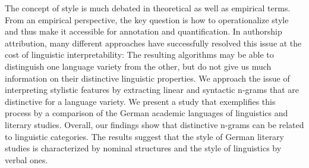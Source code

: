 The concept of style is much debated in theoretical as well as empirical terms. From an empirical perspective, the key question is how to operationalize style and thus make it accessible for annotation and quantification. In authorship attribution, many different approaches have successfully resolved this issue at the cost of linguistic interpretability: The resulting algorithms may be able to distinguish one language variety from the other, but do not give us much information on their distinctive linguistic properties. We approach the issue of interpreting stylistic features by extracting linear and syntactic n-grams that are distinctive for a language variety. We present a study that exemplifies this process by a comparison of the German academic languages of linguistics and literary studies. Overall, our findings show that distinctive n-grams can be related to linguistic categories. The results suggest that the style of German literary studies is characterized by nominal structures and the style of linguistics by verbal ones.
